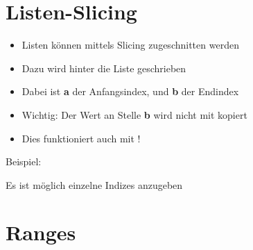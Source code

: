\livecoding

\section{Listen-Slicing}
\begin{frame}
    \slidehead
    \begin{itemize}
        \item Listen können mittels Slicing zugeschnitten werden
            \pause
        \item Dazu wird  hinter die Liste geschrieben
        \item Dabei ist \textbf{a} der Anfangsindex, und \textbf{b} der Endindex
            \pause
        \item Wichtig: Der Wert an Stelle \textbf{b} wird nicht mit kopiert
        \item Dies funktioniert auch mit !
    \end{itemize}
    \pause

    \begin{block}{Beispiel:}
    \end{block}
\end{frame}

\begin{frame}
    \slidehead
    Es ist möglich einzelne Indizes anzugeben
\end{frame}

\livecoding

\section{Ranges}
